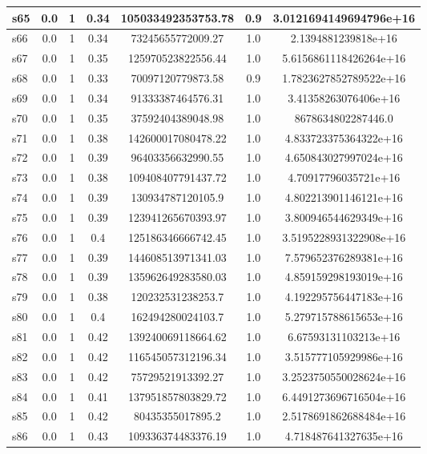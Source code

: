 \documentclass{article}
\begin{document}
\begin{tabular}{|l|c|c|c|c|c|c|}
\hline
s65 &0.0 & 1 & 0.34 & 105033492353753.78 & 0.9 & 3.0121694149694796e+16\\
\hline
s66 &0.0 & 1 & 0.34 & 73245655772009.27 & 1.0 & 2.1394881239818e+16\\
\hline
s67 &0.0 & 1 & 0.35 & 125970523822556.44 & 1.0 & 5.6156861118426264e+16\\
\hline
s68 &0.0 & 1 & 0.33 & 70097120779873.58 & 0.9 & 1.7823627852789522e+16\\
\hline
s69 &0.0 & 1 & 0.34 & 91333387464576.31 & 1.0 & 3.41358263076406e+16\\
\hline
s70 &0.0 & 1 & 0.35 & 37592404389048.98 & 1.0 & 8678634802287446.0\\
\hline
s71 &0.0 & 1 & 0.38 & 142600017080478.22 & 1.0 & 4.833723375364322e+16\\
\hline
s72 &0.0 & 1 & 0.39 & 96403356632990.55 & 1.0 & 4.650843027997024e+16\\
\hline
s73 &0.0 & 1 & 0.38 & 109408407791437.72 & 1.0 & 4.70917796035721e+16\\
\hline
s74 &0.0 & 1 & 0.39 & 130934787120105.9 & 1.0 & 4.802213901146121e+16\\
\hline
s75 &0.0 & 1 & 0.39 & 123941265670393.97 & 1.0 & 3.800946544629349e+16\\
\hline
s76 &0.0 & 1 & 0.4 & 125186346666742.45 & 1.0 & 3.5195228931322908e+16\\
\hline
s77 &0.0 & 1 & 0.39 & 144608513971341.03 & 1.0 & 7.579652376289381e+16\\
\hline
s78 &0.0 & 1 & 0.39 & 135962649283580.03 & 1.0 & 4.859159298193019e+16\\
\hline
s79 &0.0 & 1 & 0.38 & 120232531238253.7 & 1.0 & 4.192295756447183e+16\\
\hline
s80 &0.0 & 1 & 0.4 & 162494280024103.7 & 1.0 & 5.279715788615653e+16\\
\hline
s81 &0.0 & 1 & 0.42 & 139240069118664.62 & 1.0 & 6.67593131103213e+16\\
\hline
s82 &0.0 & 1 & 0.42 & 116545057312196.34 & 1.0 & 3.515777105929986e+16\\
\hline
s83 &0.0 & 1 & 0.42 & 75729521913392.27 & 1.0 & 3.2523750550028624e+16\\
\hline
s84 &0.0 & 1 & 0.41 & 137951857803829.72 & 1.0 & 6.4491273696716504e+16\\
\hline
s85 &0.0 & 1 & 0.42 & 80435355017895.2 & 1.0 & 2.5178691862688484e+16\\
\hline
s86 &0.0 & 1 & 0.43 & 109336374483376.19 & 1.0 & 4.718487641327635e+16\\

\end{tabular}
\end{document}

